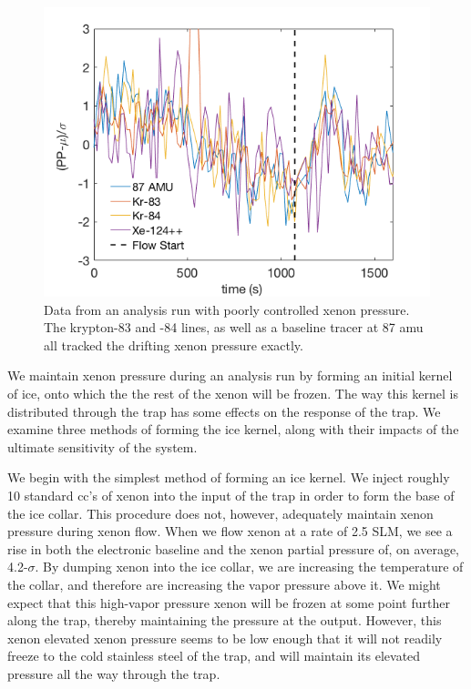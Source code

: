 \documentclass[12pt]{article}
\begin{document}
\begin{figure}[h!]
\centering
\includegraphics[width=\textwidth]{Figures/RGA_noise_correlation.png}
\caption{Data from an analysis run with poorly controlled xenon pressure. The krypton-83 and -84 lines, as well as a baseline tracer at 87 amu all tracked the drifting xenon pressure exactly. } 
\label{fig:correlatednoise}
\end{figure} 

We maintain xenon pressure during an analysis run by forming an initial kernel of ice, onto which the the rest of the xenon will be frozen. The way this kernel is distributed through the trap has some effects on the response of the trap. We examine three methods of forming the ice kernel, along with their impacts of the ultimate sensitivity of the system. 

We begin with the simplest method of forming an ice kernel. We inject roughly 10 standard cc's of xenon into the input of the trap in order to form the base of the ice collar. This procedure does not, however, adequately maintain xenon pressure during xenon flow. When we flow xenon at a rate of 2.5 SLM, we see a rise in both the electronic baseline and the xenon partial pressure of, on average, 4.2-$\sigma$. By dumping xenon into the ice collar, we are increasing the temperature of the collar, and therefore are increasing the vapor pressure above it. We might expect that this high-vapor pressure xenon will be frozen at some point further along the trap, thereby maintaining the pressure at the output. However, this xenon elevated xenon pressure seems to be low enough that it will not readily freeze to the cold stainless steel of the trap, and will maintain its elevated pressure all the way through the trap.
\end{document}
